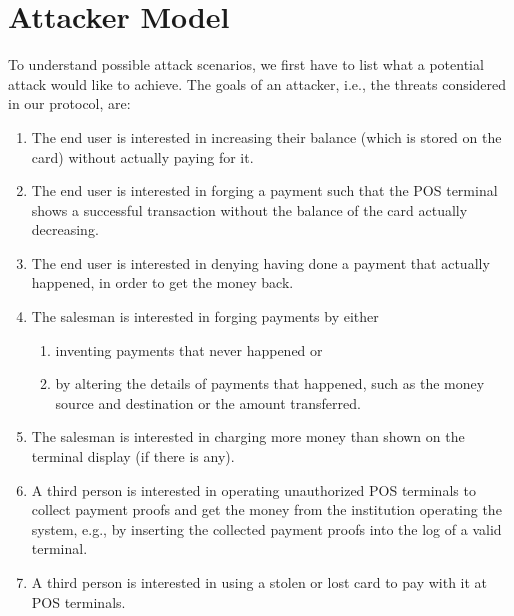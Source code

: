 \documentclass{article}
\begin{document}
\section{Attacker Model}\label{attackerModel}
To understand possible attack scenarios, we first have to list what a potential attack would like to achieve.
The goals of an attacker, i.e., the threats considered in our protocol, are:
\begin{enumerate}[label={T\arabic*:}, leftmargin=2\parindent, ref={T\arabic*}]
    \item \label{threat:increaseWithoutPaying}
    The end user is interested in increasing their balance (which is stored on the card) without actually paying for it.
    
    \item \label{threat:payWithoutDecrease}
    The end user is interested in forging a payment such that the POS terminal shows a successful transaction without the balance of the card actually decreasing.
    
    \item \label{threat:denyPayment}
    The end user is interested in denying having done a payment that actually happened, in order to get the money back.
    
    \item \label{threat:forgingPayments} The salesman is interested in forging payments by either 
    \begin{enumerate}[ref={\theenumi~\alph*}]
        \item \label{threat:inventNewPayments}
        inventing payments that never happened or
        \item \label{threat:alterPaymentDetails}
        by altering the details of payments that happened, such as the money source and destination or the amount transferred.
    \end{enumerate}
        
    \item \label{threat:chargeMoreThanDisplayed}
    The salesman is interested in charging more money than shown on the terminal display (if there is any).

    \item \label{threat:invaldTermial} A third person is interested in operating unauthorized POS terminals to collect payment proofs and get the money from the institution operating the system, e.g., by inserting the collected payment proofs into the log of a valid terminal.

    \item \label{threat:stolenCard} A third person is interested in using a stolen or lost card to pay with it at POS terminals.
\end{enumerate}
\end{document}
